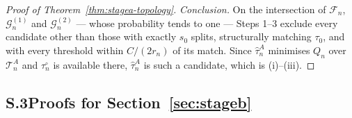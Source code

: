 \documentclass[11pt]{article}
\theoremstyle{plain}
\theoremstyle{definition}
\theoremstyle{remark}
\newcommand{\cT}{\mathcal{T}}
\begin{document}
\begin{proof}[Proof of Theorem~\ref{thm:stagea-topology}]
\emph{Conclusion.}
On the intersection of \(\mathcal{F}_n\), \(\mathcal{G}_n^{(1)}\) and \(\mathcal{G}_n^{(2)}\) ---
whose probability tends to one --- Steps 1--3 exclude every candidate other
than those with exactly \(s_0\) splits, structurally matching \(\tau_0\), and
with every threshold within \(C/(2r_n)\) of its match. Since
\(\hat\tau^A_n\) minimises \(Q_n\) over \(\cT^A_n\) and \(\tau_n^\circ\) is
available there, \(\hat\tau^A_n\) is such a candidate, which is (i)--(iii).
\end{proof}


\subsection*{S.3\quad Proofs for Section~\ref{sec:stageb}}%
\label{sec:supp-stageb}
\end{document}
